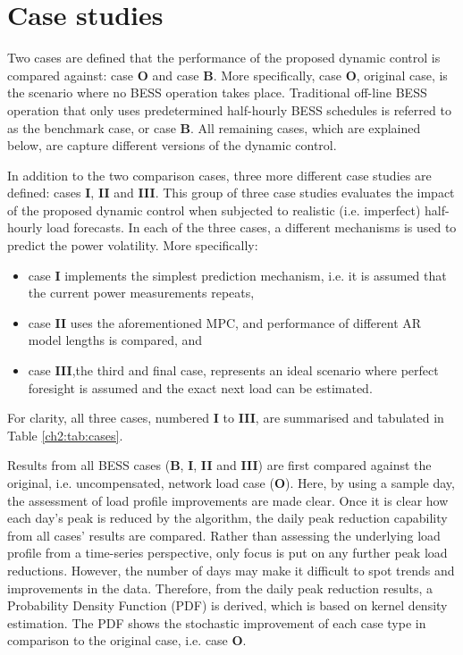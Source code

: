 \section{Case studies}
\label{ch2:sec:case-studies}

Two cases are defined that the performance of the proposed dynamic control is compared against: case \textbf{O} and case \textbf{B}.
More specifically, case \textbf{O}, original case, is the scenario where no BESS operation takes place.
Traditional off-line BESS operation that only uses predetermined half-hourly BESS schedules is referred to as the benchmark case, or case \textbf{B}.
All remaining cases, which are explained below, are capture different versions of the dynamic control.

In addition to the two comparison cases, three more different case studies are defined: cases \textbf{I}, \textbf{II} and \textbf{III}.
This group of three case studies evaluates the impact of the proposed dynamic control when subjected to realistic (i.e. imperfect) half-hourly load forecasts.
In each of the three cases, a different mechanisms is used to predict the power volatility.
More specifically:
\begin{itemize}
	\item case \textbf{I} implements the simplest prediction mechanism, i.e. it is assumed that the current power measurements repeats,
	\item case \textbf{II} uses the aforementioned MPC, and performance of different AR model lengths is compared, and
	\item case \textbf{III},the third and final case, represents an ideal scenario where perfect foresight is assumed and the exact next load can be estimated.
\end{itemize}
For clarity, all three cases, numbered \textbf{I} to \textbf{III}, are summarised and tabulated in Table \ref{ch2:tab:cases}.



Results from all BESS cases (\textbf{B}, \textbf{I}, \textbf{II} and \textbf{III}) are first compared against the original, i.e. uncompensated, network load case (\textbf{O}).
Here, by using a sample day, the assessment of load profile improvements are made clear.
Once it is clear how each day's peak is reduced by the algorithm, the daily peak reduction capability from all cases' results are compared.
Rather than assessing the underlying load profile from a time-series perspective, only focus is put on any further peak load reductions.
However, the number of days may make it difficult to spot trends and improvements in the data.
Therefore, from the daily peak reduction results, a Probability Density Function (PDF) is derived, which is based on kernel density estimation.
The PDF shows the stochastic improvement of each case type in comparison to the original case, i.e. case \textbf{O}.
